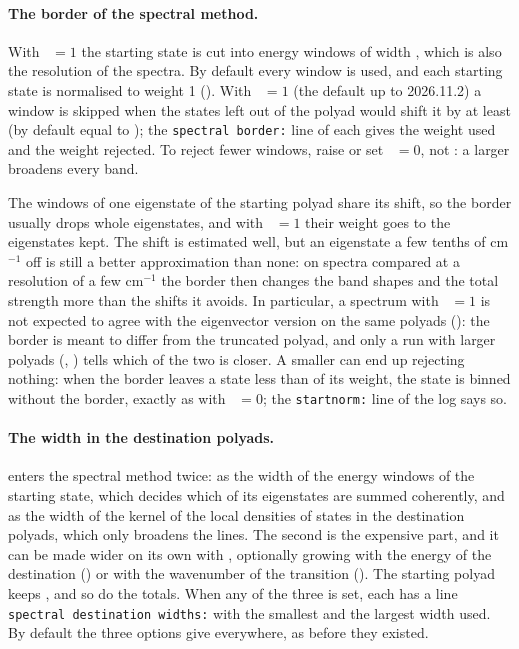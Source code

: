 \paragraph{The border of the spectral method.} With ~$=1$
the starting state is cut into energy windows of width
, which is also the resolution of the spectra. By
default every window is used, and each starting state is normalised to
weight 1 (). With
~$=1$ (the default up to 2026.11.2) a window is skipped when the
states left out of the polyad would shift it by at least
 (by default equal to ); the
\texttt{spectral border:} line of each  gives the weight
used and the weight rejected. To reject fewer windows, raise
 or set ~$=0$, not
: a larger  broadens every band.

The windows of one eigenstate of the starting polyad share its shift, so
the border usually drops whole eigenstates, and with ~$=1$
their weight goes to the eigenstates kept. The shift is estimated well,
but an eigenstate a few tenths of cm$^{-1}$ off is still a better
approximation than none: on spectra compared at a resolution of a few
cm$^{-1}$ the border then changes the band shapes and the total strength
more than the shifts it avoids. In particular, a spectrum with
~$=1$ is not expected to agree with the eigenvector
version on the same polyads (): the border is meant to
differ from the truncated polyad, and only a run with larger polyads
(, ) tells which of the two is closer.
A smaller  can end up rejecting nothing: when the
border leaves a state less than  of its weight, the
state is binned without the border, exactly as with
~$=0$; the \texttt{startnorm:} line of the log says
so.

\paragraph{The width in the destination polyads.}\label{sec:destwidth}
 enters the spectral method twice: as the width of the
energy windows of the starting state, which decides which of its
eigenstates are summed coherently, and as the width of the kernel of the
local densities of states in the destination polyads, which only
broadens the lines. The second is the expensive part, and it can be made
wider on its own with , optionally growing with
the energy of the destination () or with the
wavenumber of the transition (). The starting
polyad keeps , and so do the totals. When any of the
three is set, each  has a line
\texttt{spectral destination widths:} with the smallest and the largest
width used. By default the three options give 
everywhere, as before they existed.

